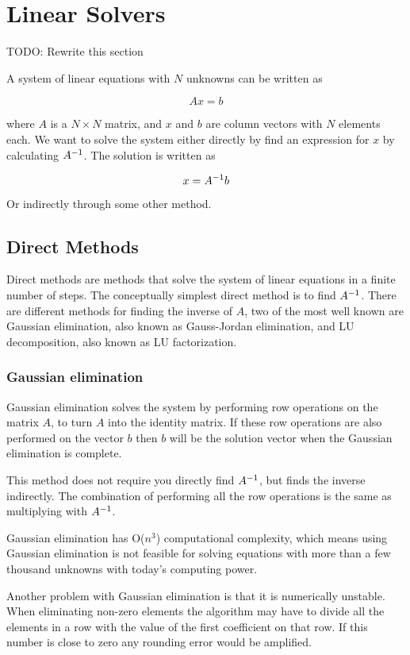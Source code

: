 \section*{Linear Solvers}

TODO: Rewrite this section

A system of linear equations with $N$ unknowns can be written as 

$$Ax = b$$

where $A$ is a $N \times N$ matrix, and $x$ and $b$ are column vectors with $N$ 
elements each. We want to solve the system either directly by find an expression 
for $x$ by calculating ${A}^{-1}$. The solution is written as 

$$x = {A}^{-1}b$$

Or indirectly through some other method.

\subsection*{Direct Methods}

Direct methods are methods that solve the system of linear equations in a finite
number of steps. The conceptually simplest direct method is to find ${A}^{-1}$. 
There are different methods for finding the inverse of $A$, two of the most 
well known are Gaussian elimination, also known as Gauss-Jordan elimination, 
and LU decomposition, also known as LU factorization.

\subsubsection*{Gaussian elimination}

Gaussian elimination solves the system by performing row operations on the matrix 
$A$, to turn $A$ into the identity matrix. If these row operations are also performed 
on the vector $b$ then $b$ will be the solution vector when the Gaussian elimination 
is complete.

This method does not require you directly find ${A}^{-1}$, but finds the inverse 
indirectly. The combination of performing all the row operations is the same as 
multiplying with ${A}^{-1}$.

Gaussian elimination has O($n^3$) computational complexity, which means using 
Gaussian elimination is not feasible for solving equations with more than a few 
thousand unknowns with today's computing power.

Another problem with Gaussian elimination is that it is numerically unstable. 
When eliminating non-zero elements the algorithm may have to divide all the elements 
in a row with the value of the first coefficient on that row. If this number is 
close to zero any rounding error would be amplified.


